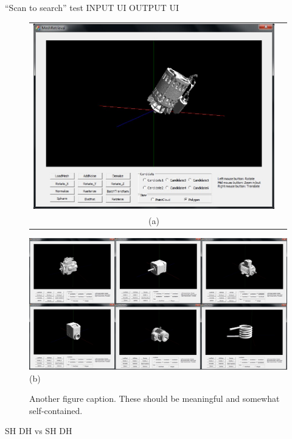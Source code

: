 \begin{enumerate}
``Scan to search'' test 
INPUT UI
OUTPUT UI

\begin{figure}
\begin{center}
\begin{tabular}{cc}   %
   \includegraphics[width=0.6\linewidth]{input_scantosearch_test}  \\
   (a) \\
\end{tabular}
   \includegraphics[width=1\linewidth]{output_scantosearch_test}  \\
   (b)  \\
\caption{Another figure caption. These should be meaningful and somewhat self-contained.} 
  \label{scantosearchtest_UI}
\end{center}
\end{figure}


SH  DH   vs   SH DH


\end{enumerate}

